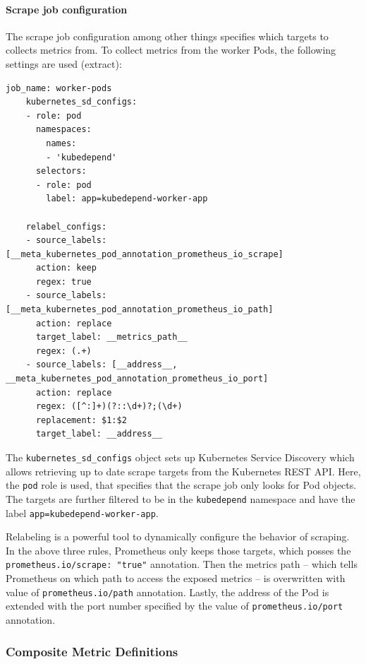 \paragraph{Scrape job configuration} The scrape job configuration among other things specifies which targets to collects metrics from. To collect metrics from the worker Pods, the following settings are used (extract):

\vspace{0.5cm}
\begin{minipage}{\linewidth}
	\begin{lstlisting}[caption={Prometheus scrape configuration for worker pods}, label={lst:worker-pods-scrape-job}]
	job_name: worker-pods
	kubernetes_sd_configs:
	- role: pod
	  namespaces:
	    names:
	    - 'kubedepend'
	  selectors:
	  - role: pod
	    label: app=kubedepend-worker-app
	
	relabel_configs:
	- source_labels: [__meta_kubernetes_pod_annotation_prometheus_io_scrape]
	  action: keep
	  regex: true
	- source_labels: [__meta_kubernetes_pod_annotation_prometheus_io_path]
	  action: replace
	  target_label: __metrics_path__
	  regex: (.+)
	- source_labels: [__address__, __meta_kubernetes_pod_annotation_prometheus_io_port]
	  action: replace
	  regex: ([^:]+)(?::\d+)?;(\d+)
	  replacement: $1:$2
	  target_label: __address__
	\end{lstlisting}
\end{minipage}

The \texttt{kubernetes\_sd\_configs} object sets up Kubernetes Service Discovery which allows retrieving up to date scrape targets from the Kubernetes REST API. Here, the \texttt{pod} role is used, that specifies that the scrape job only looks for Pod objects. The targets are further filtered to be in the \texttt{kubedepend} namespace and have the label \texttt{app=kubedepend-worker-app}.

Relabeling is a powerful tool to dynamically configure the behavior of scraping. In the above three rules, Prometheus only keeps those targets, which posses the \texttt{prometheus.io/scrape: "true"} annotation. Then the metrics path -- which tells Prometheus on which path to access the exposed metrics -- is overwritten with value of \texttt{prometheus.io/path} annotation. Lastly, the address of the Pod is extended with the port number specified by the value of \texttt{prometheus.io/port} annotation.

\subsubsection{Composite Metric Definitions}

